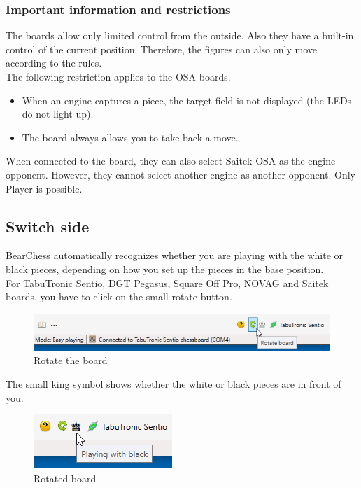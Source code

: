 \documentclass[11pt,a4paper]{article}
\begin{document}
\subsubsection{Important information and restrictions} \label{InformationOSA}
The boards allow only limited control from the outside. Also they have a built-in control of the current position. Therefore, the figures can also only move according to the rules.\\
The following restriction applies to the OSA boards.

\begin{itemize}
	\item When an engine captures a piece, the target field is not displayed (the LEDs do not light up). 
	\item The board always allows you to take back a move.
\end{itemize}

When connected to the board, they can also select Saitek OSA as the engine opponent.
However, they cannot select another engine as another opponent. Only Player is possible.

\subsection{Switch side}
BearChess automatically recognizes whether you are playing with the white or black pieces, depending on how you set up the pieces in the base position.\\

For TabuTronic Sentio, DGT Pegasus, Square Off Pro, NOVAG and Saitek boards, you have
to click on the small rotate button.

\begin{figure}[H]
	\centering
	\includegraphics[scale=0.75]{rotate1.png}
	\caption{Rotate the board}
	\label{fig:Rotate1}
\end{figure}

The small king symbol shows whether the white or black pieces are in front of you.

\begin{figure}[H]
	\centering
	\includegraphics[scale=1.0]{rotate2.png}
	\caption{Rotated board}
	\label{fig:Rotate2}
\end{figure}
\end{document}

